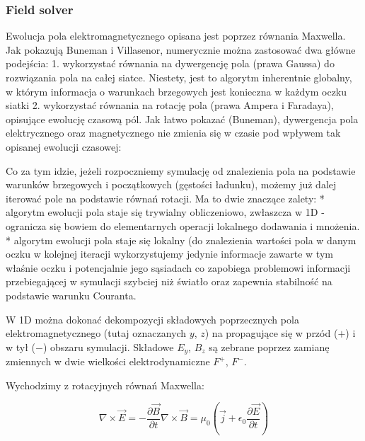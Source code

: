     \subsubsection{Field solver} %

    Ewolucja pola elektromagnetycznego opisana jest poprzez równania Maxwella. Jak pokazują Buneman i Villasenor,
    numerycznie można zastosować dwa główne podejścia: %
    1. wykorzystać równania na dywergencję pola (prawa Gaussa) do rozwiązania pola na całej siatce. Niestety, jest to
    algorytm inherentnie globalny, w którym informacja o warunkach brzegowych jest konieczna w każdym oczku siatki
    2. wykorzystać równania na rotację pola (prawa Ampera i Faradaya), opisujące ewolucję czasową pól. Jak łatwo pokazać (Buneman),
    dywergencja pola elektrycznego oraz magnetycznego nie zmienia się w czasie pod wpływem tak opisanej ewolucji czasowej:

    Co za tym idzie, jeżeli rozpoczniemy symulację od znalezienia pola na podstawie warunków brzegowych i początkowych (gęstości
    ładunku), możemy już dalej iterować pole na podstawie równań rotacji. Ma to dwie znaczące zalety:
    * algorytm ewolucji pola staje się trywialny obliczeniowo, zwłaszcza w 1D -
        ogranicza się bowiem do elementarnych operacji lokalnego dodawania i mnożenia.
    * algorytm ewolucji pola staje się lokalny (do znalezienia wartości pola w danym oczku w kolejnej iteracji wykorzystujemy
    jedynie informacje zawarte w tym właśnie oczku i potencjalnie jego sąsiadach %
    co zapobiega problemowi informacji przebiegającej w symulacji szybciej niż światło oraz zapewnia stabilność na podstawie
    warunku Couranta.

    W 1D można dokonać dekompozycji składowych poprzecznych pola elektromagnetycznego (tutaj oznaczanych $y$, $z$) na
    propagujące się w przód ($+$) i w tył ($-$) obszaru symulacji. Składowe $E_y$, $B_z$ są zebrane poprzez zamianę zmiennych
    w dwie wielkości elektrodynamiczne $F^+$, $F^-$.

    Wychodzimy z rotacyjnych równań Maxwella:

    \begin{equation}
        \nabla \times \vec{E} = -\frac{\partial \vec{B}}{\partial t}
        \nabla \times \vec{B} = \mu_0 (\vec{j} + \epsilon_0 \frac{\partial \vec{E}}{\partial t})
        \label{eqn:Maxwell-rotation-derivation}
    \end{equation}

